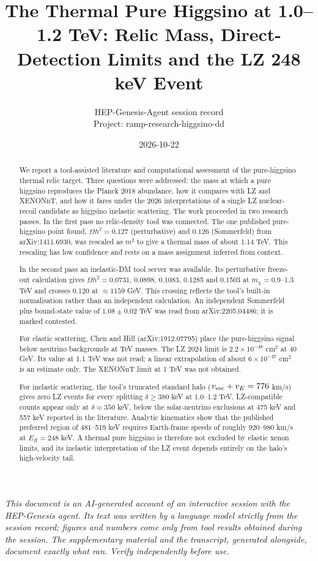 \documentclass[11pt,a4paper]{article}
\title{The Thermal Pure Higgsino at 1.0--1.2 TeV: Relic Mass, Direct-Detection Limits and the LZ 248 keV Event}
\author{HEP-Genesis-Agent session record \\ \small Project: ramp-research-higgsino-dd}
\date{2026-10-22}
\begin{document}
\maketitle
\noindent\textit{\small This document is an AI-generated account of an interactive session with the HEP-Genesis agent. Its text was written by a language model strictly from the session record; figures and numbers come only from tool results obtained during the session. The supplementary material and the transcript, generated alongside, document exactly what ran. Verify independently before use.}
\vspace{1em}

\begin{abstract}
We report a tool-assisted literature and computational assessment of the pure-higgsino thermal relic target. Three questions were addressed: the mass at which a pure higgsino reproduces the Planck 2018 abundance, how it compares with LZ and XENONnT, and how it fares under the 2026 interpretations of a single LZ nuclear-recoil candidate as higgsino inelastic scattering. The work proceeded in two research passes. In the first pass no relic-density tool was connected. The one published pure-higgsino point found, $\Omega h^2=0.127$ (perturbative) and $0.126$ (Sommerfeld) from arXiv:1411.6930, was rescaled as $m^2$ to give a thermal mass of about 1.14 TeV. This rescaling has low confidence and rests on a mass assignment inferred from context.

In the second pass an inelastic-DM tool server was available. Its perturbative freeze-out calculation gives $\Omega h^2=0.0731$, 0.0898, 0.1083, 0.1285 and 0.1503 at $m_\chi=0.9$--1.3 TeV and crosses 0.120 at $\approx1159$ GeV. This crossing reflects the tool's built-in normalisation rather than an independent calculation. An independent Sommerfeld plus bound-state value of $1.08\pm0.02$ TeV was read from arXiv:2205.04486; it is marked contested.

For elastic scattering, Chen and Hill (arXiv:1912.07795) place the pure-higgsino signal below neutrino backgrounds at TeV masses. The LZ 2024 limit is $2.2\times10^{-48}$ cm$^2$ at 40 GeV. Its value at 1.1 TeV was not read; a linear extrapolation of about $6\times10^{-47}$ cm$^2$ is an estimate only. The XENONnT limit at 1 TeV was not obtained.

For inelastic scattering, the tool's truncated standard halo ($v_{\rm esc}+v_E=776$ km/s) gives zero LZ events for every splitting $\delta\geq380$ keV at 1.0--1.2 TeV. LZ-compatible counts appear only at $\delta\approx350$ keV, below the solar-neutrino exclusions at 475 keV and 557 keV reported in the literature. Analytic kinematics show that the published preferred region of 481--519 keV requires Earth-frame speeds of roughly 920--980 km/s at $E_R=248$ keV. A thermal pure higgsino is therefore not excluded by elastic xenon limits, and its inelastic interpretation of the LZ event depends entirely on the halo's high-velocity tail.
\end{abstract}
\end{document}
